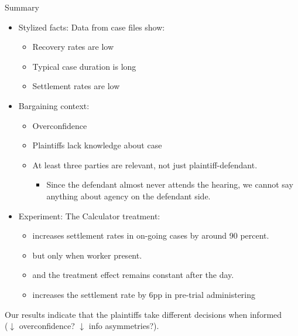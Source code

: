 \documentclass[9pt]{beamer}
\begin{document}
\begin{frame}{Summary}
  \begin{itemize}
  \item \alert{Stylized facts:} Data from case files show:
  \begin{itemize}
      \item Recovery rates are low
      \item Typical case duration is long
      \item Settlement rates are low
  \end{itemize}  
    \vspace{0.05in}
    \pause
  \item  \alert{Bargaining context:} 
  \begin{itemize}
      \item Overconfidence
      \item Plaintiffs lack knowledge about case
      \item At least three parties are relevant, not just plaintiff-defendant. 
      \begin{itemize}
          \item Since the defendant almost never attends the hearing, we cannot say anything about agency on the defendant side. 
      \end{itemize}
  \end{itemize}
    \vspace{2mm}
    \pause
  \item \alert{Experiment:} The Calculator treatment:
\begin{itemize} 
    \item increases settlement rates in on-going cases by around 90 percent.
    \item but \alert{only when worker present}.
    \item and the treatment effect remains constant after the day.
    \item increases the settlement rate by 6pp in pre-trial administering
\end{itemize}

  \end{itemize}
  \vspace{2mm}
  \pause
Our results indicate that the plaintiffs take different decisions when informed \\ ($\downarrow$ overconfidence?  $\downarrow$ info asymmetries?). 
 \end{frame}
 
\end{document}
